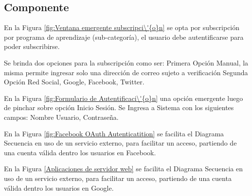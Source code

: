 \subsection{Componente}

En la Figura \ref{fig:Ventana emergente subscripci\'{o}n} se opta por 
subscripci\'{o}n por programa de aprendizaje (sub-categor\'{i}a), el
usuario debe autentificarse para poder subscribirse.

Se brinda dos opciones para la subscripci\'{o}n como ser: Primera Opci\'{o}n
Manual, la misma permite ingresar solo una direcci\'{o}n de correo sujeto a verificaci\'{o}n
Segunda Opci\'{o}n Red Social, Google, Facebook, Twitter. 

\begin{minipage}{1.0\textwidth}
	\centering
	\label{fig:Ventana emergente subscripci\'{o}n}
\end{minipage}

En la Figura \ref{fig:Formulario de Autentificaci\'{o}n} una opci\'{o}n emergente
luego de pinchar sobre opci\'{o}n Inicio Sesi\'{o}n. Se Ingresa a Sistema con
los siguientes campos: Nombre Usuario, Contrase\~{n}a.

\begin{minipage}{1.0\textwidth}
	\centering
	\label{fig:Formulario de Autentificaci\'{o}n}
\end{minipage}

En la Figura \ref{fig:Facebook OAuth Autenticatition} se facilita el Diagrama 
Secuencia en uso de un servicio externo, para facilitar un acceso, partiendo
de una cuenta v\'{a}lida dentro los usuarios en Facebook.

\begin{minipage}{1.0\textwidth}
	\centering
	\label{fig:Facebook OAuth Autenticatition}
\end{minipage}

En la Figura \ref{Aplicaciones de servidor web} se facilita el Diagrama Secuencia
en uso de un servicio externo, para facilitar un acceso, partiendo de una cuenta
v\'{a}lida dentro los usuarios en Google.

